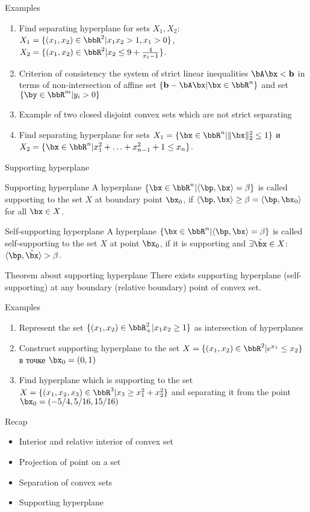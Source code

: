 \documentclass[12pt]{beamer}
\begin{document}
\begin{frame}{Examples}
\begin{enumerate}
\item Find separating hyperplane for sets $X_1, X_2$: $X_1 = \{ (x_1, x_2) \in \bbR^2 | x_1x_2 > 1, x_1 > 0 \}$, $X_2 = \{ (x_1, x_2) \in \bbR^2 |  x_2 \leq 9 + \frac{4}{x_1 - 1} \}$.
\item Criterion of consistency the system of strict linear inequalities  $\bA\bx < \mathbf{b}$ in terms of non-intersection of affine set $\{\mathbf{b} - \bA\bx | \bx \in \bbR^n \}$ and set $\{ \by \in \bbR^m | y_i > 0 \}$ 
\item Example of two closed disjoint convex sets which are not strict separating
\item Find separating hyperplane for sets $X_1 = \{ \bx \in \bbR^n | \| \bx \|^2_2 \leq 1 \}$ и $X_2 = \{ \bx \in \bbR^n | x_1^2 + \ldots + x_{n-1}^2 + 1 \leq x_n \}$.
\end{enumerate}
\end{frame}

\begin{frame}{Supporting hyperplane}
\begin{block}{Supporting hyperplane}
A hyperplane $\{ \bx \in \bbR^n | \langle \bp, \bx \rangle = \beta \}$ is called supporting to the set $X$ at boundary point $\bx_0$, if $\langle \bp, \bx \rangle \geq \beta = \langle \bp, \bx_0 \rangle$ for all $\bx \in X$.
\end{block}

\begin{block}{Self-supporting hyperplane}
A hyperplane $\{ \bx \in \bbR^n | \langle \bp, \bx \rangle = \beta \}$ is called self-supporting to the set $X$ at point $\bx_0$, if it is supporting and $\exists \tilde{\bx} \in X$: $\langle \bp, \tilde{\bx} \rangle > \beta$.
\end{block}

\begin{block}{Theorem about supporting hyperplane}
There exists supporting hyperplane (self-supporting) at any boundary (relative boundary) point of convex set.
\end{block}
\end{frame}


\begin{frame}{Examples}
\begin{enumerate}
\item Represent the set $\{ (x_1, x_2) \in \bbR_+^2| x_1x_2 \geq 1\}$ as intersection of hyperplanes
\item Construct supporting hyperplane to the set $X = \{ (x_1, x_2) \in \bbR^2 | e^{x_1} \leq x_2 \}$ в точке $\bx_0 = (0, 1)$
\item Find hyperplane which is supporting to the set $X = \{ (x_1, x_2, x_3) \in \bbR^3 | x_3 \geq x_1^2 + x_2^2 \}$ and separating it from the point $\bx_0 = (-5/4, 5 / 16, 15/16)$
\end{enumerate}
\end{frame}


\begin{frame}{Recap}
\begin{itemize}
\item Interior and relative interior of convex set
\item Projection of point on a set
\item Separation of convex sets
\item Supporting hyperplane 
\end{itemize}
\end{frame}
\end{document}
